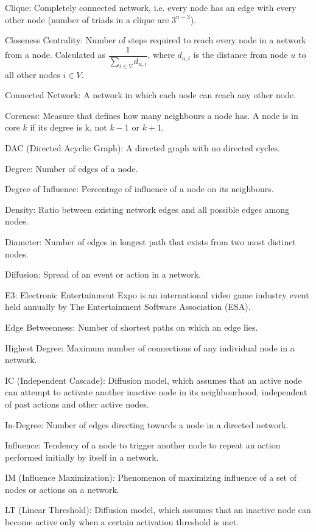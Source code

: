 Clique: Completely connected network, i.e. every node has an edge with every other node (number of triads in a clique are $3^{n-3}$).

Closeness Centrality: Number of steps required to reach every node in a network from a node. Calculated as $\dfrac{1}{\sum_{i\in V}d_{u,i}}$, where $d_{u,i}$ is the distance from node $u$ to all other nodes $i\in V$.

Connected Network: A network in which each node can reach any other node.

Coreness: Measure that defines how many neighbours a node has. A node is in core $k$ if its degree is k, not $k-1$ or $k+1$.

DAC (Directed Acyclic Graph): A directed graph with no directed cycles.

Degree: Number of edges of a node.

Degree of Influence: Percentage of influence of a node on its neighbours.

Density: Ratio between existing network edges and all possible edges among nodes.

Diameter: Number of edges in longest path that exists from two most distinct nodes.

Diffusion: Spread of an event or action in a network.

E3: Electronic Entertainment Expo is an international video game industry event held annually by The Entertainment Software Association (ESA).

Edge Betweenness: Number of shortest paths on which an edge lies.

Highest Degree: Maximum number of connections of any individual node in a network.
	
IC (Independent Cascade): Diffusion model, which assumes that an active node can attempt to activate another inactive node in its neighbourhood, independent of past actions and other active nodes.

In-Degree: Number of edges directing towards a node in a directed network.

Influence: Tendency of a node to trigger another node to repeat an action performed initially by itself in a network.

IM (Influence Maximization): Phenomenon of maximizing influence of a set of nodes or actions on a network.

LT (Linear Threshold): Diffusion model, which assumes that an inactive node can become active only when a certain activation threshold is met.

